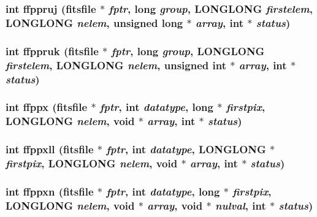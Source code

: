 \subsubsection{\setlength{\rightskip}{0pt plus 5cm}int ffppruj (\bf{fitsfile} $\ast$ {\em fptr}, long {\em group}, \bf{LONGLONG} {\em firstelem}, \bf{LONGLONG} {\em nelem}, unsigned long $\ast$ {\em array}, int $\ast$ {\em status})}\label{fitsio_8h_4a659ff524a1a425fda4b2063373f848}


\subsubsection{\setlength{\rightskip}{0pt plus 5cm}int ffppruk (\bf{fitsfile} $\ast$ {\em fptr}, long {\em group}, \bf{LONGLONG} {\em firstelem}, \bf{LONGLONG} {\em nelem}, unsigned int $\ast$ {\em array}, int $\ast$ {\em status})}\label{fitsio_8h_380316a0418b53a2e545f283279a3eff}


\subsubsection{\setlength{\rightskip}{0pt plus 5cm}int ffppx (\bf{fitsfile} $\ast$ {\em fptr}, int {\em datatype}, long $\ast$ {\em firstpix}, \bf{LONGLONG} {\em nelem}, void $\ast$ {\em array}, int $\ast$ {\em status})}\label{fitsio_8h_9a545226811c5df0f85e0bd4c98f0f95}


\subsubsection{\setlength{\rightskip}{0pt plus 5cm}int ffppxll (\bf{fitsfile} $\ast$ {\em fptr}, int {\em datatype}, \bf{LONGLONG} $\ast$ {\em firstpix}, \bf{LONGLONG} {\em nelem}, void $\ast$ {\em array}, int $\ast$ {\em status})}\label{fitsio_8h_a5a52d455af81ac3c3ea32e15ce790fe}


\subsubsection{\setlength{\rightskip}{0pt plus 5cm}int ffppxn (\bf{fitsfile} $\ast$ {\em fptr}, int {\em datatype}, long $\ast$ {\em firstpix}, \bf{LONGLONG} {\em nelem}, void $\ast$ {\em array}, void $\ast$ {\em nulval}, int $\ast$ {\em status})}\label{fitsio_8h_2ff55dfbe37f1ecf48227480629dc956}


